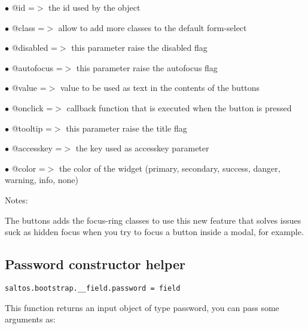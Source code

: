 \documentclass[a4paper]{book}
\begin{document}
\begin{compactitem}
\item[\color{myblue}$\bullet$] @id        =$>$ the id used by the object
\item[\color{myblue}$\bullet$] @class     =$>$ allow to add more classes to the default form-select
\item[\color{myblue}$\bullet$] @disabled  =$>$ this parameter raise the disabled flag
\item[\color{myblue}$\bullet$] @autofocus =$>$ this parameter raise the autofocus flag
\item[\color{myblue}$\bullet$] @value     =$>$ value to be used as text in the contents of the buttons
\item[\color{myblue}$\bullet$] @onclick   =$>$ callback function that is executed when the button is pressed
\item[\color{myblue}$\bullet$] @tooltip   =$>$ this parameter raise the title flag
\item[\color{myblue}$\bullet$] @accesskey =$>$ the key used as accesskey parameter
\item[\color{myblue}$\bullet$] @color     =$>$ the color of the widget (primary, secondary, success, danger, warning, info, none)
\end{compactitem}

Notes:

The buttons adds the focus-ring classes to use this new feature that solves issues suck as
hidden focus when you try to focus a button inside a modal, for example.

\hypertarget{toc477}{}
\subsection{Password constructor helper}

\begin{lstlisting}
saltos.bootstrap.__field.password = field
\end{lstlisting}

This function returns an input object of type password, you can pass some arguments as:
\end{document}
